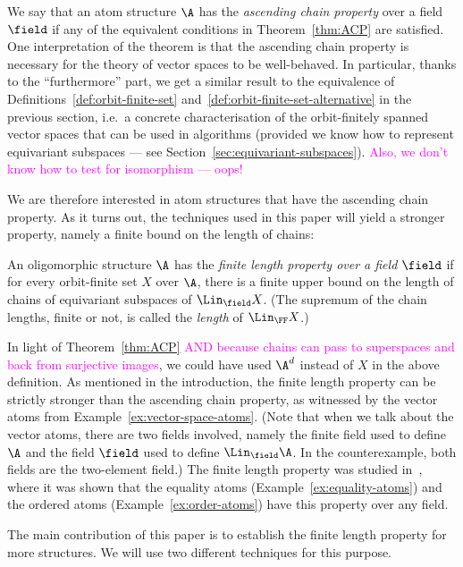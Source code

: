 We say that an atom structure $\A$ has the \emph{ascending chain property} over a field $\field$ if any of the equivalent conditions in Theorem~\ref{thm:ACP} are satisfied. 
One interpretation of the theorem is that the ascending chain property is necessary for the theory of vector spaces to be well-behaved. 
In particular, thanks to the ``furthermore'' part, we get a similar result to the equivalence of Definitions~\ref{def:orbit-finite-set} and~\ref{def:orbit-finite-set-alternative} in the previous section, 
i.e.~a concrete characterisation of the orbit-finitely spanned vector spaces that can be used in algorithms (provided we know how to represent equivariant subspaces --- see Section~\ref{sec:equivariant-subspaces}). 
\textcolor{magenta}{Also, we don't know how to test for isomorphism --- oops!}


We are therefore interested in atom structures that have the ascending chain property. 
As it turns out, the techniques used in this paper will yield a stronger property, namely a finite bound on the length of chains: 




\begin{definition}
    \label{def:finite-length-property}
    An oligomorphic structure $\A$ has the \emph{finite length property over a field $\field$} if for every orbit-finite set $X$ over $\A$, there is a finite upper bound on the length of chains of equivariant subspaces 
    of $\Lin_\field X$.
    (The supremum of the chain lengths, finite or not, is called the \emph{length} of $\Lin_\FF X$.)
\end{definition}

In light of Theorem~\ref{thm:ACP} \textcolor{magenta}{AND because chains can pass to superspaces and back from surjective images}, we could have used $\A^d$ instead of $X$ in the above definition.
As mentioned in the introduction, the finite length property can be strictly stronger than the ascending chain property, as witnessed by the vector atoms from Example~\ref{ex:vector-space-atoms}. 
(Note that when we talk about the vector atoms, there are two fields involved, namely the finite field used to define $\A$ and the field $\field$ used to define $\Lin_\field \A$. 
In the counterexample, both fields are the two-element field.)
The finite length property was studied in~\cite{BFKM24}, where it was shown that the equality atoms (Example~\ref{ex:equality-atoms}) and the ordered atoms (Example~\ref{ex:order-atoms}) have this property over any field. 

The main contribution of this paper is to establish the finite length property for more structures. 
We will use two different techniques for this purpose.
